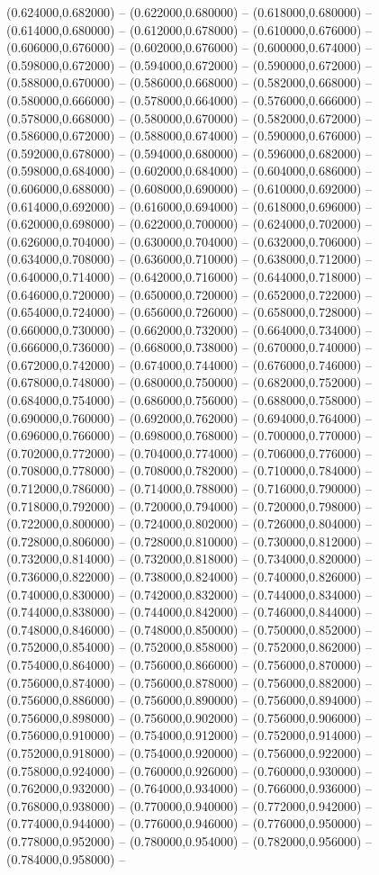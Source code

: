 (0.624000,0.682000) -- (0.622000,0.680000) -- (0.618000,0.680000) -- (0.614000,0.680000) -- (0.612000,0.678000) -- (0.610000,0.676000) -- (0.606000,0.676000) -- (0.602000,0.676000) -- (0.600000,0.674000) -- (0.598000,0.672000) -- (0.594000,0.672000) -- (0.590000,0.672000) -- (0.588000,0.670000) -- (0.586000,0.668000) -- (0.582000,0.668000) -- (0.580000,0.666000) -- (0.578000,0.664000) -- (0.576000,0.666000) -- (0.578000,0.668000) -- (0.580000,0.670000) -- (0.582000,0.672000) -- (0.586000,0.672000) -- (0.588000,0.674000) -- (0.590000,0.676000) -- (0.592000,0.678000) -- (0.594000,0.680000) -- (0.596000,0.682000) -- (0.598000,0.684000) -- (0.602000,0.684000) -- (0.604000,0.686000) -- (0.606000,0.688000) -- (0.608000,0.690000) -- (0.610000,0.692000) -- (0.614000,0.692000) -- (0.616000,0.694000) -- (0.618000,0.696000) -- (0.620000,0.698000) -- (0.622000,0.700000) -- (0.624000,0.702000) -- (0.626000,0.704000) -- (0.630000,0.704000) -- (0.632000,0.706000) -- (0.634000,0.708000) -- (0.636000,0.710000) -- (0.638000,0.712000) -- (0.640000,0.714000) -- (0.642000,0.716000) -- (0.644000,0.718000) -- (0.646000,0.720000) -- (0.650000,0.720000) -- (0.652000,0.722000) -- (0.654000,0.724000) -- (0.656000,0.726000) -- (0.658000,0.728000) -- (0.660000,0.730000) -- (0.662000,0.732000) -- (0.664000,0.734000) -- (0.666000,0.736000) -- (0.668000,0.738000) -- (0.670000,0.740000) -- (0.672000,0.742000) -- (0.674000,0.744000) -- (0.676000,0.746000) -- (0.678000,0.748000) -- (0.680000,0.750000) -- (0.682000,0.752000) -- (0.684000,0.754000) -- (0.686000,0.756000) -- (0.688000,0.758000) -- (0.690000,0.760000) -- (0.692000,0.762000) -- (0.694000,0.764000) -- (0.696000,0.766000) -- (0.698000,0.768000) -- (0.700000,0.770000) -- (0.702000,0.772000) -- (0.704000,0.774000) -- (0.706000,0.776000) -- (0.708000,0.778000) -- (0.708000,0.782000) -- (0.710000,0.784000) -- (0.712000,0.786000) -- (0.714000,0.788000) -- (0.716000,0.790000) -- (0.718000,0.792000) -- (0.720000,0.794000) -- (0.720000,0.798000) -- (0.722000,0.800000) -- (0.724000,0.802000) -- (0.726000,0.804000) -- (0.728000,0.806000) -- (0.728000,0.810000) -- (0.730000,0.812000) -- (0.732000,0.814000) -- (0.732000,0.818000) -- (0.734000,0.820000) -- (0.736000,0.822000) -- (0.738000,0.824000) -- (0.740000,0.826000) -- (0.740000,0.830000) -- (0.742000,0.832000) -- (0.744000,0.834000) -- (0.744000,0.838000) -- (0.744000,0.842000) -- (0.746000,0.844000) -- (0.748000,0.846000) -- (0.748000,0.850000) -- (0.750000,0.852000) -- (0.752000,0.854000) -- (0.752000,0.858000) -- (0.752000,0.862000) -- (0.754000,0.864000) -- (0.756000,0.866000) -- (0.756000,0.870000) -- (0.756000,0.874000) -- (0.756000,0.878000) -- (0.756000,0.882000) -- (0.756000,0.886000) -- (0.756000,0.890000) -- (0.756000,0.894000) -- (0.756000,0.898000) -- (0.756000,0.902000) -- (0.756000,0.906000) -- (0.756000,0.910000) -- (0.754000,0.912000) -- (0.752000,0.914000) -- (0.752000,0.918000) -- (0.754000,0.920000) -- (0.756000,0.922000) -- (0.758000,0.924000) -- (0.760000,0.926000) -- (0.760000,0.930000) -- (0.762000,0.932000) -- (0.764000,0.934000) -- (0.766000,0.936000) -- (0.768000,0.938000) -- (0.770000,0.940000) -- (0.772000,0.942000) -- (0.774000,0.944000) -- (0.776000,0.946000) -- (0.776000,0.950000) -- (0.778000,0.952000) -- (0.780000,0.954000) -- (0.782000,0.956000) -- (0.784000,0.958000) -- 